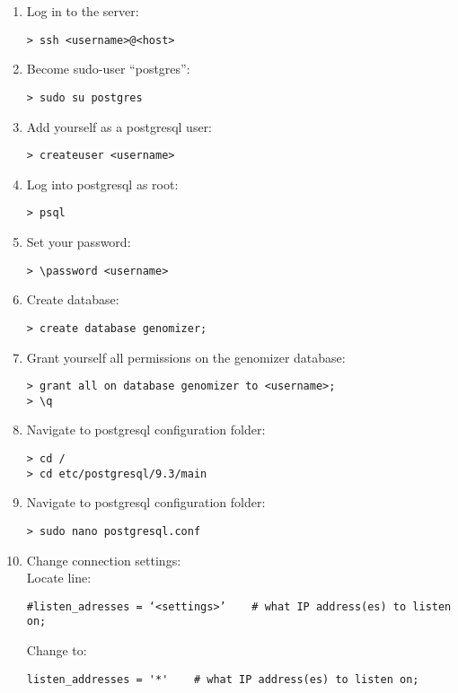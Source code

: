     \begin{enumerate}
      \item Log in to the server:
      \begin{verbatim}
> ssh <username>@<host>
      \end{verbatim}

      \item Become sudo-user “postgres”:
      \begin{verbatim}
> sudo su postgres
      \end{verbatim}

      \item Add yourself as a postgresql user:
      \begin{verbatim}
> createuser <username>
      \end{verbatim}

      \item Log into postgresql as root:
      \begin{verbatim}
> psql
      \end{verbatim}

      \item Set your password:
      \begin{verbatim}
> \password <username>
      \end{verbatim}

      \item Create database:
      \begin{verbatim}
> create database genomizer;
      \end{verbatim}

      \item Grant yourself all permissions on the genomizer database: \begin{verbatim}
> grant all on database genomizer to <username>;
> \q
      \end{verbatim}

      \item Navigate to postgresql configuration folder:
      \begin{verbatim}
> cd /
> cd etc/postgresql/9.3/main
      \end{verbatim}

      \item Navigate to postgresql configuration folder:
      \begin{verbatim}
> sudo nano postgresql.conf
      \end{verbatim}

      \item Change connection settings:\\Locate line: 
      \begin{verbatim}
#listen_adresses = ‘<settings>’    # what IP address(es) to listen on;
      \end{verbatim}
      Change to:
      \begin{verbatim}
listen_addresses = '*'    # what IP address(es) to listen on;
      \end{verbatim}


\end{enumerate}
